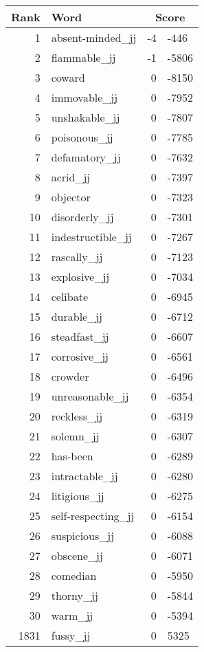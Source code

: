 \begin{longtable}[!htbp]{| rlr@{.}l |}
    \hline
    \textbf{Rank} & \textbf{Word} & \multicolumn{2}{c|}{\textbf{Score}} \\
    \hline
    \endhead
    1 & absent-minded\_jj & -4 & -446 \\
    2 & flammable\_jj & -1 & -5806 \\
    3 & coward & 0 & -8150 \\
    4 & immovable\_jj & 0 & -7952 \\
    5 & unshakable\_jj & 0 & -7807 \\
    6 & poisonous\_jj & 0 & -7785 \\
    7 & defamatory\_jj & 0 & -7632 \\
    8 & acrid\_jj & 0 & -7397 \\
    9 & objector & 0 & -7323 \\
    10 & disorderly\_jj & 0 & -7301 \\
    11 & indestructible\_jj & 0 & -7267 \\
    12 & rascally\_jj & 0 & -7123 \\
    13 & explosive\_jj & 0 & -7034 \\
    14 & celibate & 0 & -6945 \\
    15 & durable\_jj & 0 & -6712 \\
    16 & steadfast\_jj & 0 & -6607 \\
    17 & corrosive\_jj & 0 & -6561 \\
    18 & crowder & 0 & -6496 \\
    19 & unreasonable\_jj & 0 & -6354 \\
    20 & reckless\_jj & 0 & -6319 \\
    21 & solemn\_jj & 0 & -6307 \\
    22 & has-been & 0 & -6289 \\
    23 & intractable\_jj & 0 & -6280 \\
    24 & litigious\_jj & 0 & -6275 \\
    25 & self-respecting\_jj & 0 & -6154 \\
    26 & suspicious\_jj & 0 & -6088 \\
    27 & obscene\_jj & 0 & -6071 \\
    28 & comedian & 0 & -5950 \\
    29 & thorny\_jj & 0 & -5844 \\
    30 & warm\_jj & 0 & -5394 \\
    1831 & fussy\_jj & 0 & 5325 \\

\end{longtable}
